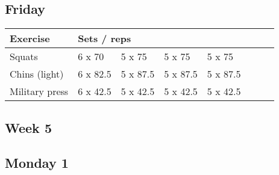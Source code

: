\documentclass[12pt, a4paper]{article}%
\begin{document}
  \subsection*{\hspace{0.5em} Friday }


  \begin{tabular}{l|lllllll}
  \hspace{0.75em} \textbf{Exercise} & \multicolumn{ 7 }{l}{ \textbf{Sets / reps} } \\ \hline

            \hspace{0.75em} Squats
            & 6 x 70
            & 5 x 75
            & 5 x 75
            & 5 x 75
            & 
            & 
            & 
            \\


            \hspace{0.75em} Chins (light)
            & 6 x 82.5
            & 5 x 87.5
            & 5 x 87.5
            & 5 x 87.5
            & 
            & 
            & 
            \\


            \hspace{0.75em} Military press
            & 6 x 42.5
            & 5 x 42.5
            & 5 x 42.5
            & 5 x 42.5
            & 
            & 
            & 
            \\


  \end{tabular}


\clearpage \subsection*{\hspace{0.25em} Week 5 }
  \subsection*{\hspace{0.5em} Monday 1 }
\end{document}
